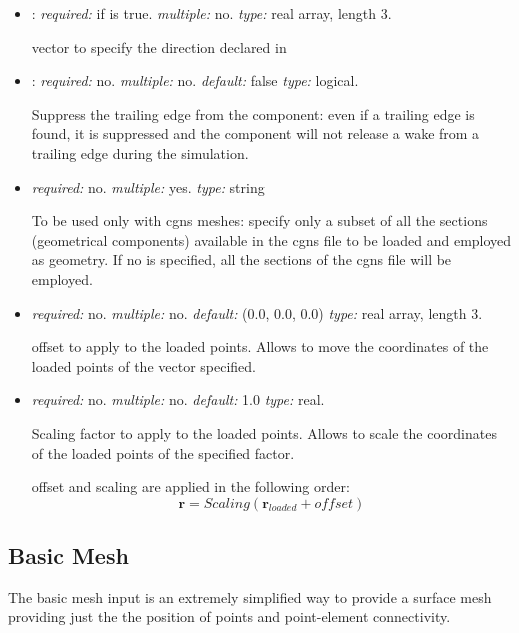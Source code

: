 \begin{itemize}
\item {}: \textit{required:} if  is true. 
\textit{multiple:} no. \textit{type:} real array, length 3.

vector to specify the direction declared in 

\item {}: \textit{required:} no. \textit{multiple:} no. \textit{default:} false \textit{type:} logical.

Suppress the trailing edge from the component: even if a trailing edge is found, 
it is suppressed and the component will not release a wake from a trailing edge during the simulation.

\item {} \textit{required:} no. \textit{multiple:} yes. \textit{type:} string 

To be used only with cgns meshes: specify only a subset of all the sections (geometrical components) 
available in the cgns file to be loaded and employed as geometry. 
If no  is specified, all the sections of the cgns file will be employed.

\item {} \textit{required:} no. \textit{multiple:} no. 
\textit{default:} (0.0, 0.0, 0.0) \textit{type:} real array, length 3.

offset to apply to the loaded points. Allows to move the coordinates of the loaded points of the vector specified. 

\item {} \textit{required:} no. \textit{multiple:} no. \textit{default:} 1.0 \textit{type:} real.

Scaling factor to apply to the loaded points. Allows to scale the coordinates of 
the loaded points of the specified factor.

offset and scaling are applied in the following order:
\begin{equation*}
\mathbf{r} = Scaling (\mathbf{r}_{loaded}+offset)
\end{equation*}
\end{itemize}

\subsection{Basic Mesh}
\label{subsec:Basic_Mesh}

The basic mesh input is an extremely simplified way to provide a surface mesh providing just the the 
position of points and point-element connectivity. 

